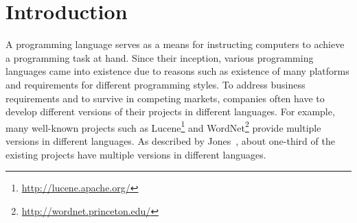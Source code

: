 \section{Introduction}
\label{sec:introduction}

A programming language serves as a means for instructing computers
to achieve a programming task at hand. Since their inception,
various programming languages came into existence due to reasons
such as existence of many platforms and requirements for different
programming styles. To address business requirements
and to survive in competing markets, companies often have to develop
different versions of their projects in different languages. For
example, many well-known projects such as
Lucene\footnote{\url{http://lucene.apache.org/}} and
WordNet\footnote{\url{http://wordnet.princeton.edu/}} provide
multiple versions in different languages. As described by
Jones~\cite{jones1998estimating}, about one-third of the existing
projects have multiple versions in different languages.



